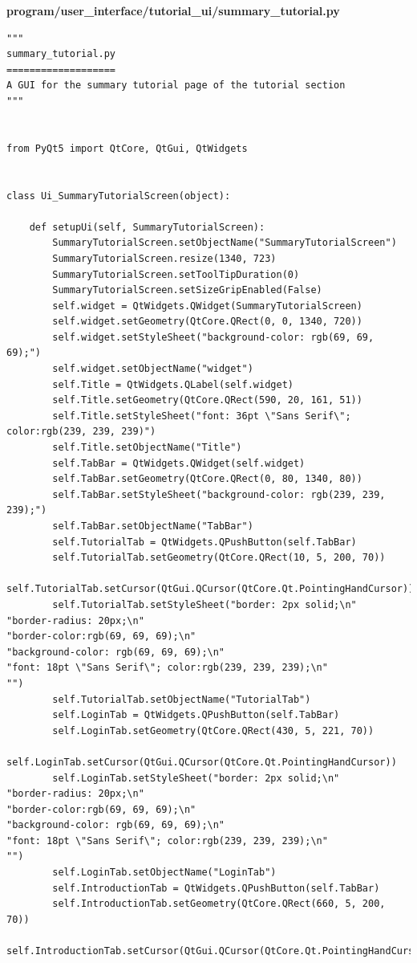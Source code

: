 \documentclass[12pt]{article}
\begin{document}
\textbf{program/user\_interface/tutorial\_ui/summary\_tutorial.py}
\begin{lstlisting}
"""
summary_tutorial.py
===================
A GUI for the summary tutorial page of the tutorial section
"""


from PyQt5 import QtCore, QtGui, QtWidgets


class Ui_SummaryTutorialScreen(object):

    def setupUi(self, SummaryTutorialScreen):
        SummaryTutorialScreen.setObjectName("SummaryTutorialScreen")
        SummaryTutorialScreen.resize(1340, 723)
        SummaryTutorialScreen.setToolTipDuration(0)
        SummaryTutorialScreen.setSizeGripEnabled(False)
        self.widget = QtWidgets.QWidget(SummaryTutorialScreen)
        self.widget.setGeometry(QtCore.QRect(0, 0, 1340, 720))
        self.widget.setStyleSheet("background-color: rgb(69, 69, 69);")
        self.widget.setObjectName("widget")
        self.Title = QtWidgets.QLabel(self.widget)
        self.Title.setGeometry(QtCore.QRect(590, 20, 161, 51))
        self.Title.setStyleSheet("font: 36pt \"Sans Serif\"; color:rgb(239, 239, 239)")
        self.Title.setObjectName("Title")
        self.TabBar = QtWidgets.QWidget(self.widget)
        self.TabBar.setGeometry(QtCore.QRect(0, 80, 1340, 80))
        self.TabBar.setStyleSheet("background-color: rgb(239, 239, 239);")
        self.TabBar.setObjectName("TabBar")
        self.TutorialTab = QtWidgets.QPushButton(self.TabBar)
        self.TutorialTab.setGeometry(QtCore.QRect(10, 5, 200, 70))
        self.TutorialTab.setCursor(QtGui.QCursor(QtCore.Qt.PointingHandCursor))
        self.TutorialTab.setStyleSheet("border: 2px solid;\n"
"border-radius: 20px;\n"
"border-color:rgb(69, 69, 69);\n"
"background-color: rgb(69, 69, 69);\n"
"font: 18pt \"Sans Serif\"; color:rgb(239, 239, 239);\n"
"")
        self.TutorialTab.setObjectName("TutorialTab")
        self.LoginTab = QtWidgets.QPushButton(self.TabBar)
        self.LoginTab.setGeometry(QtCore.QRect(430, 5, 221, 70))
        self.LoginTab.setCursor(QtGui.QCursor(QtCore.Qt.PointingHandCursor))
        self.LoginTab.setStyleSheet("border: 2px solid;\n"
"border-radius: 20px;\n"
"border-color:rgb(69, 69, 69);\n"
"background-color: rgb(69, 69, 69);\n"
"font: 18pt \"Sans Serif\"; color:rgb(239, 239, 239);\n"
"")
        self.LoginTab.setObjectName("LoginTab")
        self.IntroductionTab = QtWidgets.QPushButton(self.TabBar)
        self.IntroductionTab.setGeometry(QtCore.QRect(660, 5, 200, 70))
        self.IntroductionTab.setCursor(QtGui.QCursor(QtCore.Qt.PointingHandCursor))

\end{lstlisting}
\end{document}
